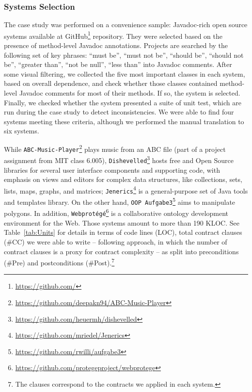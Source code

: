\subsubsection{Systems Selection} 
\label{sec:systems}

The case study was performed on a convenience sample: \totalSystems{} Javadoc-rich open source systems available at GitHub\footnote{\url{https://github.com/}} repository.
They were selected based on the presence of method-level Javadoc annotations. 
Projects are searched by the following set of key phrases: ``must be'', ``must not be'', ``should
be'', ``should not be'', ``greater than'', ``not be null'', ``less than'' into Javadoc
comments.
After some visual filtering, we collected the five most important classes in
each system, based on overall dependence, and check whether those classes
contained method-level Javadoc comments for most of their methods. If so, the
system is selected. Finally, we checked whether the system presented a suite of
unit test, which are run during the case study to detect inconsistencies. We
were able to find four systems meeting these criteria, although we performed the
manual translation to six systems.

While \texttt{ABC-Music-Player}\footnote{\url{https://github.com/deepakn94/ABC-Music-Player}}
plays music from an ABC file (part of a project assignment from MIT class
6.005), \texttt{Dishevelled}\footnote{\url{https://github.com/heuermh/dishevelled}} hosts
free and Open Source libraries for several user interface components and
supporting code, with emphasis on views and editors for complex data structures, like collections, sets, lists, maps, graphs, and
matrices; \texttt{Jenerics}\footnote{\url{https://github.com/mriedel/Jenerics}} is a general-purpose set of Java tools and templates library.
On the other hand, \texttt{OOP
Aufgabe3}\footnote{\url{https://github.com/rwilli/aufgabe3}} aims to manipulate
polygons. In addition,
\texttt{Webprot\'{e}g\'{e}}\footnote{\url{https://github.com/protegeproject/webprotege}}
is a collaborative ontology development environment for the Web. Those systems amount to more than 190 KLOC. See Table~\ref{tab:Units} for details in
terms of code lines (LOC), total contract clauses (\#CC) we were able to write
-- following \cite{Estler-etal14} approach, in which the number of contract clauses is a proxy for contract complexity -- as split
into preconditions (\#Pre) and postconditions (\#Post).\footnote{The clauses
correspond to the contracts we applied in each system.}

